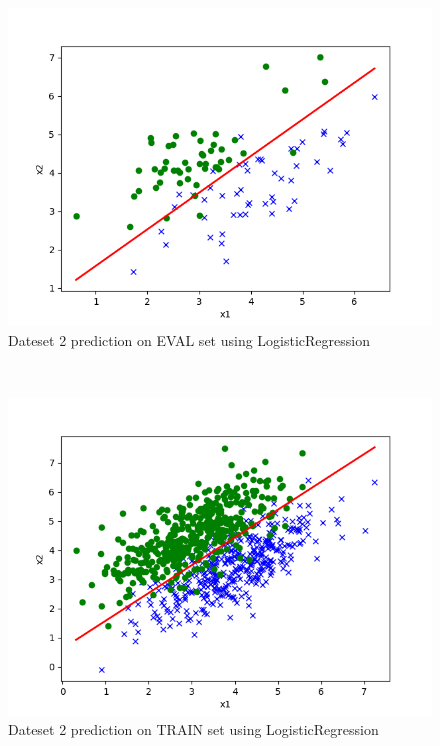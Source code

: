 \begin{answer}
\begin{figure}
  \includegraphics[width=\linewidth]{../src/output/p01b_pred_2_eval.png}
  \caption{Dateset 2 prediction on EVAL set using LogisticRegression}
  \label{fig:Dateset 2 prediction on EVAL set using LogisticRegression}
\end{figure}\\
\begin{figure}
  \includegraphics[width=\linewidth]{../src/output/p01b_pred_2_train.png}
  \caption{Dateset 2 prediction on TRAIN set using LogisticRegression}
  \label{fig:Dateset 2 prediction on TRAIN set using LogisticRegression}
\end{figure}\\

\end{answer}
